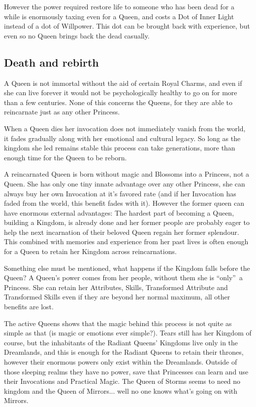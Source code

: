 However the power required restore life to someone who has been dead for a while is enormously taxing even for a Queen, and costs a Dot of Inner Light instead of a dot of Willpower. This dot can be brought back with experience, but even so no Queen brings back the dead casually.

\subsection*{Death and rebirth}

A Queen is not immortal without the aid of certain Royal Charms, and even if she can live forever it would not be psychologically healthy to go on for more than a few centuries. None of this concerns the Queens, for they are able to reincarnate just as any other Princess. 

When a Queen dies her invocation does not immediately vanish from the world, it fades gradually along with her emotional and cultural legacy. So long as the kingdom she led remains stable this process can take generations, more than enough time for the Queen to be reborn. 

A reincarnated Queen is born without magic and Blossoms into a Princess, not a Queen. She has only one tiny innate advantage over any other Princess, she can always buy her own Invocation at it's favored rate (and if her Invocation has faded from the world, this benefit fades with it). However the former queen can have enormous external advantages: The hardest part of becoming a Queen, building a Kingdom, is already done and her former people are probably eager to help the next incarnation of their beloved Queen regain her former splendour. This combined with memories and experience from her past lives is often enough for a Queen to retain her Kingdom across reincarnations. 

Something else must be mentioned, what happens if the Kingdom falls before the Queen? A Queen's power comes from her people, without them she is \textquotedblleft only\textquotedblright\, a Princess. She can retain her Attributes, Skills, Transformed Attribute and Transformed Skills even if they are beyond her normal maximum, all other benefits are lost. 

The active Queens shows that the magic behind this process is not quite as simple as that (is magic or emotions ever simple?). Tears still has her Kingdom of course, but the inhabitants of the Radiant Queens' Kingdoms live only in the Dreamlands, and this is enough for the Radiant Queens to retain their thrones, however their enormous powers only exist within the Dreamlands. Outside of those sleeping realms they have no power, save that Princesses can learn and use their Invocations and Practical Magic. The Queen of Storms seems to need no kingdom and the Queen of Mirrors... well no one knows what's going on with Mirrors. 

